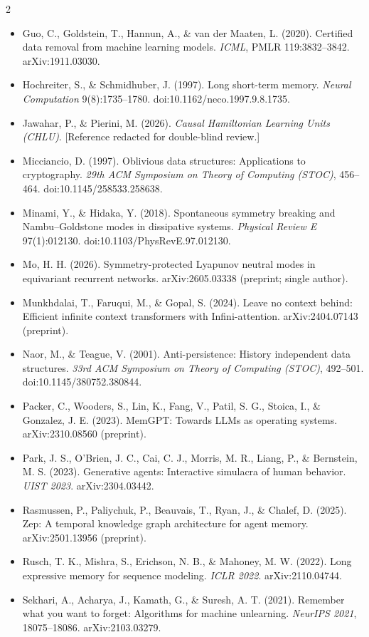 {\begin{multicols}{2}
\begin{itemize}
\item Guo, C., Goldstein, T., Hannun, A., \& van der Maaten, L. (2020). Certified data removal from machine learning models. \emph{ICML}, PMLR 119:3832--3842. arXiv:1911.03030.
\item Hochreiter, S., \& Schmidhuber, J. (1997). Long short-term memory. \emph{Neural Computation} 9(8):1735--1780. doi:10.1162/neco.1997.9.8.1735.
\item Jawahar, P., \& Pierini, M. (2026). \emph{Causal Hamiltonian Learning Units (CHLU)}. [Reference redacted for double-blind review.]
\item Micciancio, D. (1997). Oblivious data structures: Applications to cryptography. \emph{29th ACM Symposium on Theory of Computing (STOC)}, 456--464. doi:10.1145/258533.258638.
\item Minami, Y., \& Hidaka, Y. (2018). Spontaneous symmetry breaking and Nambu--Goldstone modes in dissipative systems. \emph{Physical Review E} 97(1):012130. doi:10.1103/PhysRevE.97.012130.
\item Mo, H. H. (2026). Symmetry-protected Lyapunov neutral modes in equivariant recurrent networks. arXiv:2605.03338 (preprint; single author).
\item Munkhdalai, T., Faruqui, M., \& Gopal, S. (2024). Leave no context behind: Efficient infinite context transformers with Infini-attention. arXiv:2404.07143 (preprint).
\item Naor, M., \& Teague, V. (2001). Anti-persistence: History independent data structures. \emph{33rd ACM Symposium on Theory of Computing (STOC)}, 492--501. doi:10.1145/380752.380844.
\item Packer, C., Wooders, S., Lin, K., Fang, V., Patil, S. G., Stoica, I., \& Gonzalez, J. E. (2023). MemGPT: Towards LLMs as operating systems. arXiv:2310.08560 (preprint).
\item Park, J. S., O'Brien, J. C., Cai, C. J., Morris, M. R., Liang, P., \& Bernstein, M. S. (2023). Generative agents: Interactive simulacra of human behavior. \emph{UIST 2023}. arXiv:2304.03442.
\item Rasmussen, P., Paliychuk, P., Beauvais, T., Ryan, J., \& Chalef, D. (2025). Zep: A temporal knowledge graph architecture for agent memory. arXiv:2501.13956 (preprint).
\item Rusch, T. K., Mishra, S., Erichson, N. B., \& Mahoney, M. W. (2022). Long expressive memory for sequence modeling. \emph{ICLR 2022}. arXiv:2110.04744.
\item Sekhari, A., Acharya, J., Kamath, G., \& Suresh, A. T. (2021). Remember what you want to forget: Algorithms for machine unlearning. \emph{NeurIPS 2021}, 18075--18086. arXiv:2103.03279.

\end{itemize}
\end{multicols}}
